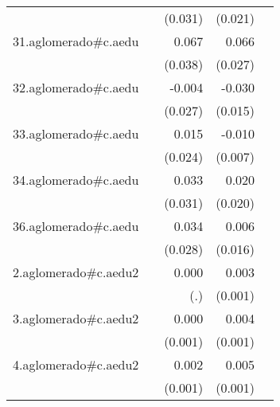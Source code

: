 {\begin{longtable}{l*{4}{D{.}{.}{-1}}}
            &                     &     (0.031)         &     (0.021)         &                     \\
\addlinespace
31.aglomerado#c.aedu&                     &       0.067         &       0.066\sym{*}  &                     \\
            &                     &     (0.038)         &     (0.027)         &                     \\
\addlinespace
32.aglomerado#c.aedu&                     &      -0.004         &      -0.030\sym{*}  &                     \\
            &                     &     (0.027)         &     (0.015)         &                     \\
\addlinespace
33.aglomerado#c.aedu&                     &       0.015         &      -0.010         &                     \\
            &                     &     (0.024)         &     (0.007)         &                     \\
\addlinespace
34.aglomerado#c.aedu&                     &       0.033         &       0.020         &                     \\
            &                     &     (0.031)         &     (0.020)         &                     \\
\addlinespace
36.aglomerado#c.aedu&                     &       0.034         &       0.006         &                     \\
            &                     &     (0.028)         &     (0.016)         &                     \\
\addlinespace
2.aglomerado#c.aedu2&                     &       0.000         &       0.003\sym{***}&                     \\
            &                     &         (.)         &     (0.001)         &                     \\
\addlinespace
3.aglomerado#c.aedu2&                     &       0.000         &       0.004\sym{***}&                     \\
            &                     &     (0.001)         &     (0.001)         &                     \\
\addlinespace
4.aglomerado#c.aedu2&                     &       0.002         &       0.005\sym{***}&                     \\
            &                     &     (0.001)         &     (0.001)         &                     \\

\end{longtable}}
